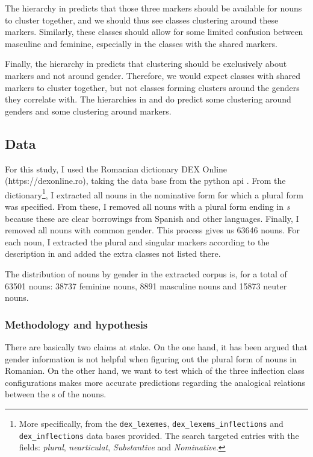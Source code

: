 The hierarchy in  predicts that those three markers should be available for nouns to cluster together, and we should thus see classes clustering around these markers. Similarly, these classes should allow for some limited confusion between masculine and feminine, especially in the classes with the shared markers.

Finally, the hierarchy in  predicts that clustering should be exclusively about markers and not around gender. Therefore, we would expect classes with shared markers to cluster together, but not classes forming clusters around the genders they correlate with. The hierarchies in  and  do predict some clustering around genders and some clustering around markers.

\subsection{Data}

For this study, I used the Romanian dictionary DEX Online (https://dexonline.ro), taking the data base from the python api \autocite{Navalici.2013}. From the dictionary\footnote{More specifically, from the \texttt{dex\_lexemes}, \texttt{dex\_lexems\_inflections} and \texttt{dex\_inflections} data bases provided. The search targeted entries with the fields: \textit{plural}, \textit{nearticulat}, \textit{Substantive} and \textit{Nominative}.}, I extracted all nouns in the nominative form for which a plural form was specified. From these, I removed all nouns with a plural form ending in \textit{s} because these are clear borrowings from Spanish and other languages. Finally, I removed all nouns with common gender. This process gives us 63646 nouns. For each noun, I extracted the plural and singular markers according to the description in \textcite{Cojocaru.2003} and added the extra classes not listed there.

The distribution of nouns by gender in the extracted corpus is, for a total of 63501 nouns: 38737 feminine nouns, 8891 masculine nouns and 15873 neuter nouns.

\subsubsection{Methodology and hypothesis}

There are basically two claims at stake. On the one hand, it has been argued that gender information is not helpful when figuring out the plural form of nouns in Romanian. On the other hand, we want to test which of the three inflection class configurations makes more accurate predictions regarding the analogical relations between the s of the nouns.

